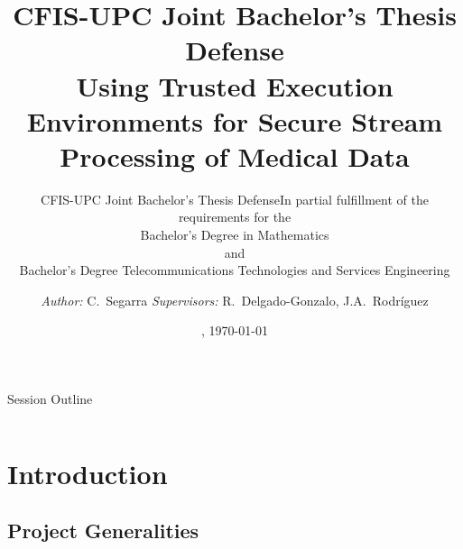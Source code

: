 \documentclass[10pt,    %
    english,            %
    xcolor=table,       %
    envcountsect,        %
    aspectratio=169     %
]{beamer}
\subtitle{CFIS-UPC Joint Bachelor's Thesis Defense} %
\title[TEEs for Secure Stream Processing] %
    {\normalsize CFIS-UPC Joint Bachelor's Thesis Defense \\ \Large Using Trusted Execution Environments for Secure Stream Processing of Medical Data}
\subtitle{\small \textmd{In partial fulfillment of the requirements for the} \\
\normalsize Bachelor's Degree in Mathematics \\ \small \textmd{and} \\ \normalsize Bachelor's Degree Telecommunications Technologies and Services Engineering \vspace{-10pt}} %
\date[Thursday, May 30th] %
    {\datedayname, \today}
\author[] %
{\textit{Author:} C.~Segarra\inst{1, 2} \hfill \textit{Supervisors:} R.~Delgado-Gonzalo\inst{1}, J.A.~Rodr\'iguez\inst{2}}
\institute[] %
{\inst{1} Swiss Center for Electronics and Microtechnology (CSEM), Switzerland, \texttt{\{first.last\}@csem.ch} \and
\inst{2} Universitat Polit\`ecnica de Catalunya (UPC), Spain, \texttt{\{carlos.segarra@estudiant., jose.fonollosa@\}upc.edu}
}
\begin{document}
\begin{frame}
  \titlepage
\end{frame}

\begin{frame}{Session Outline}
    \begin{columns}[T,onlytextwidth]
        \begin{column}{.48\textwidth}
            \tableofcontents[sections={1-2}]
        \end{column}
        \begin{column}{.48\textwidth}
            \tableofcontents[sections={3-5}]
        \end{column}
    \end{columns}
\end{frame}

\section{Introduction}
\label{sec:introduction}
\sectionframe

\subsection{Project Generalities}
\end{document}

